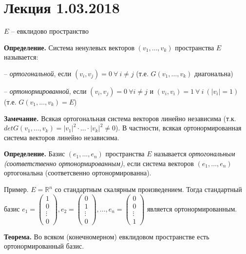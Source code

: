 \section{Лекция 1.03.2018}

$E$ -- евклидово пространство

\textbf{Определение.} Система ненулевых векторов $(v_1, \dots, v_k)$ пространства $E$ называется:

-- \textit{ортогональной}, если $(v_i, v_j) = 0 \ \forall \ i \neq j$ (т.е. $G(v_1, \dots, v_k)$ диагональна)

-- \textit{ортонормированной}, если $(v_i, v_j) = 0 \ \forall i \neq j$ и $(v_i, v_i) = 1 \ \forall \ i \ (|v_i| = 1)$ (т.е. $G(v_1, \dots, v_k) = E$)

\vspace{\baselineskip}
\textbf{Замечание.} Всякая ортогональная система векторов линейно независима (т.к. $det G(v_1, \dots, v_k) = |v_1|^2 \cdot \dots \cdot |v_k|^2 \neq 0$). В частности, всякая ортонормированная система векторов линейно независима.

\vspace{\baselineskip}
\textbf{Определение.} Базис $(e_1, \dots, e_n)$ пространства $E$ называется \textit{ортогональным (соответственно ортонормированным)}, если система векторов $(e_1, \dots, e_n)$ ортогональна (соответсвенно ортонормированна).

\vspace{\baselineskip}
Пример. 
$E = \mathbb{R}^n$ со стандартным скалярным произведением. Тогда стандартный базис $e_1 = \begin{pmatrix} 1 \\ 0 \\ \vdots \\ 0 \end{pmatrix}, e_2 = \begin{pmatrix} 0 \\ 1 \\ \vdots \\ 0 \end{pmatrix}, \dots, e_n = \begin{pmatrix} 0 \\ 0 \\ \vdots \\ 1 \end{pmatrix}$ является ортонормированным.

\vspace{\baselineskip}
\textbf{Теорема.} Во всяком (конечномерном) евклидовом пространстве есть ортонормированный базис.

